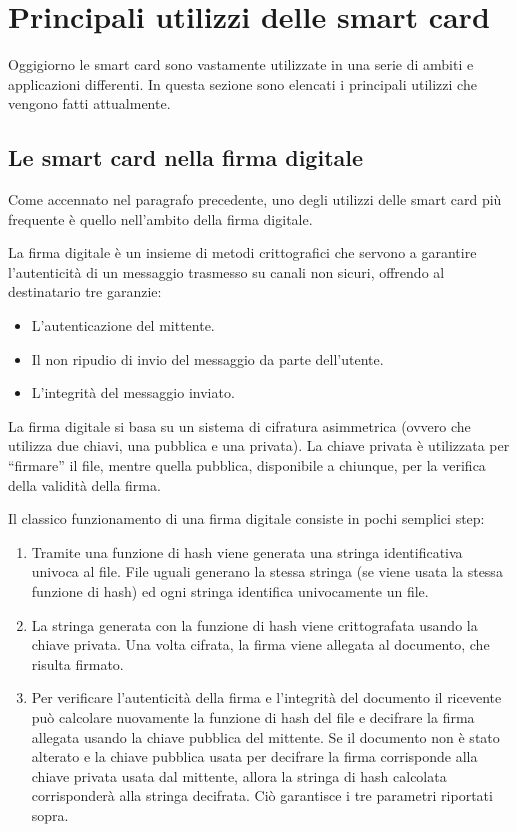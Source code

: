 \section{Principali utilizzi delle smart card}
Oggigiorno le smart card sono vastamente utilizzate in una serie di ambiti e applicazioni differenti. In questa sezione sono elencati i principali utilizzi che vengono fatti attualmente.
\subsection{Le smart card nella firma digitale}
\label{firma_digitale}
Come accennato nel paragrafo precedente, uno degli utilizzi delle smart card più frequente è quello nell'ambito della firma digitale.

La firma digitale è un insieme di metodi crittografici che servono a garantire l'autenticità di un messaggio trasmesso su canali non sicuri, offrendo al destinatario tre garanzie:
\begin{itemize}
    \item L'autenticazione del mittente.
    \item Il non ripudio di invio del messaggio da parte dell'utente.
    \item L'integrità del messaggio inviato.
\end{itemize}

La firma digitale si basa su un sistema di cifratura asimmetrica (ovvero che utilizza due chiavi, una pubblica e una privata). La chiave privata è utilizzata per ``firmare'' il file, mentre quella pubblica, disponibile a chiunque, per la verifica della validità della firma.

Il classico funzionamento di una firma digitale consiste in pochi semplici step:
\begin{enumerate}
    \item Tramite una funzione di hash viene generata una stringa identificativa univoca al file. File uguali generano la stessa stringa (se viene usata la stessa funzione di hash) ed ogni stringa identifica univocamente un file.
    \item La stringa generata con la funzione di hash viene crittografata usando la chiave privata. Una volta cifrata, la firma viene allegata al documento, che risulta firmato.
    \item Per verificare l'autenticità della firma e l'integrità del documento il ricevente può calcolare nuovamente la funzione di hash del file e decifrare la firma allegata usando la chiave pubblica del mittente. Se il documento non è stato alterato e la chiave pubblica usata per decifrare la firma corrisponde alla chiave privata usata dal mittente, allora la stringa di hash calcolata corrisponderà alla stringa decifrata. Ciò garantisce i tre parametri riportati sopra.
\end{enumerate}


